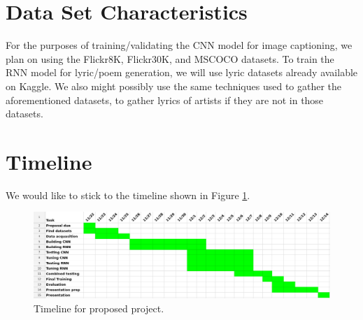 \documentclass[a4paper,10pt]{article}
\begin{document}
\section{Data Set Characteristics}

For the purposes of training/validating the CNN model for image captioning, we plan on using the Flickr8K, Flickr30K, and MSCOCO datasets. To train the RNN model for lyric/poem generation, we will use lyric datasets already available on Kaggle. We also might possibly use the same techniques used to gather the aforementioned datasets, to gather lyrics of artists if they are not in those datasets. 

\section{Timeline}

We would like to stick to the timeline shown in Figure \ref{fig:timeline}. 

\begin{figure}[h]
\centering
\includegraphics[scale=0.29]{timeline.png}
\caption{Timeline for proposed project.}
\label{fig:timeline}
\end{figure}
\end{document}
